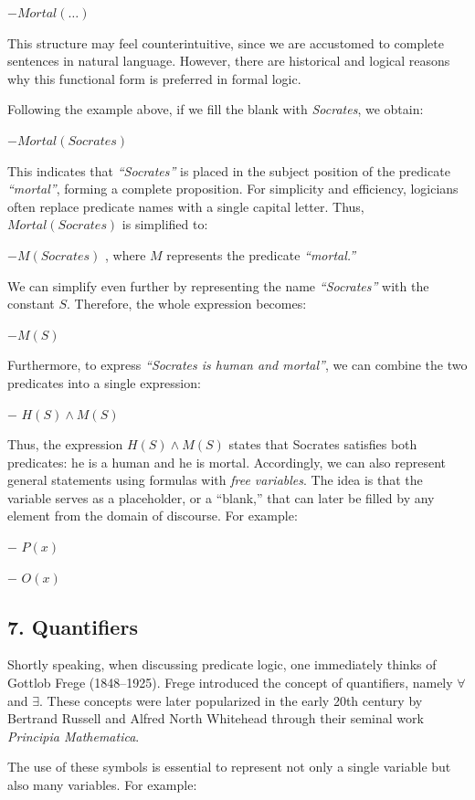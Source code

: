 −\(Mortal(\dots)\)

This structure may feel counterintuitive, since we are accustomed to
complete sentences in natural language. However, there are historical
and logical reasons why this functional form is preferred in formal
logic.

Following the example above, if we fill the blank with \emph{Socrates},
we obtain:

−\(Mortal(Socrates)\)

This indicates that \emph{``Socrates''} is placed in the subject
position of the predicate \emph{``mortal''}, forming a complete
proposition. For simplicity and efficiency, logicians often replace
predicate names with a single capital letter. Thus, \(Mortal(Socrates)\)
is simplified to:

−\(M(Socrates)\) , where \(M\) represents the predicate
\emph{``mortal.''}

We can simplify even further by representing the name
\emph{``Socrates''} with the constant \(S\). Therefore, the whole
expression becomes:

−\(M(S)\)

Furthermore, to express \emph{``Socrates is human and mortal''}, we can
combine the two predicates into a single expression:

− \(H(S) \land M(S)\)

Thus, the expression \(H(S) \land M(S)\) states that Socrates satisfies
both predicates: he is a human and he is mortal. Accordingly, we can
also represent general statements using formulas with \emph{free
variables}. The idea is that the variable serves as a placeholder, or a
``blank,'' that can later be filled by any element from the domain of
discourse. For example:

− \(P(x)\)

− \(O(x)\)

\subsection{7. Quantifiers}\label{quantifiers}

Shortly speaking, when discussing predicate logic, one immediately
thinks of Gottlob Frege (1848--1925). Frege introduced the concept of
quantifiers, namely \(\forall\) and \(\exists\). These concepts were
later popularized in the early 20th century by Bertrand Russell and
Alfred North Whitehead through their seminal work \emph{Principia
Mathematica}.

The use of these symbols is essential to represent not only a single
variable but also many variables. For example:

